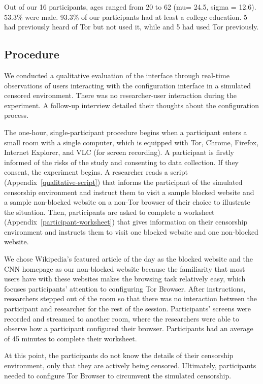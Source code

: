 \documentclass[USenglish,oneside,twocolumn]{article}
\begin{document}
Out of our 16 participants, ages ranged from 20 to 62
(mu= 24.5, sigma = 12.6). 53.3\% were male. 
93.3\% of our participants had at least
a college education. 5 had previously heard of Tor but not used it, while 
and 5 had used Tor previously. 


\subsection{Procedure}
We conducted a qualitative evaluation of the interface through real-time observations of 
users interacting with the configuration interface in a simulated censored environment.
There was no researcher-user interaction during the experiment. A follow-up interview 
detailed their thoughts about the configuration process.

The one-hour, single-participant procedure begins when a participant enters a small 
room with a single computer, which is equipped with Tor, Chrome, Firefox, Internet Explorer, 
and VLC (for screen recording). A participant is firstly informed of 
the risks of the study and consenting to data collection. If they consent, the 
experiment begins. A researcher reads a script (Appendix~\ref{qualitative-script}) that 
informs the participant of the simulated censorship environment and
instruct them to visit a sample blocked website and a sample non-blocked website on a
non-Tor browser of their choice to illustrate the situation. Then, participants are asked to 
complete a worksheet (Appendix~\ref{participant-worksheet}) that gives information
on their censorship environment and instructs them
to visit one blocked website and one non-blocked website.
 
We chose Wikipedia's featured article of the day as the blocked website and 
the CNN homepage as our non-blocked website because the familiarity 
that most users have with these websites makes the browsing task relatively easy, 
which focuses participants' attention to configuring Tor Browser. 
After instructions, researchers stepped out of the room so that there was no interaction
between the participant and researcher for the rest of the session. Participants' screens 
were recorded and streamed to another room, where the researchers were able to 
observe how a participant configured their browser. Participants had an 
average of 45 minutes to complete their worksheet. 

At this point, the participants do not know the details of their censorship environment,
only that they are actively being censored. Ultimately, participants needed to configure Tor Browser to 
circumvent the simulated censorship. 
\end{document}
